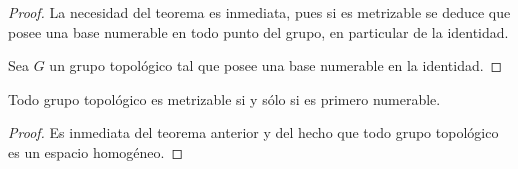 \documentclass[12pt]{report}
\theoremstyle{largebreak}
\begin{document}
    \begin{proof}
        La necesidad del teorema es inmediata, pues si es metrizable se deduce que posee una base numerable en todo punto del grupo, en particular de la identidad.

        Sea $G$ un grupo topológico tal que posee una base numerable en la identidad. 
    \end{proof}

    \begin{cor}
        Todo grupo topológico es metrizable si y sólo si es primero numerable.
    \end{cor}

    \begin{proof}
        Es inmediata del teorema anterior y del hecho que todo grupo topológico es un espacio homogéneo.

    \end{proof}
\end{document}
